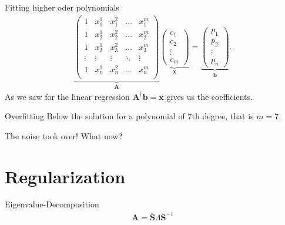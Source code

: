 \documentclass[notes]{beamer}
\begin{document}
    \begin{frame}{Fitting higher oder polynomials}
      \begin{align}
        \underbrace{
        \begin{pmatrix}
          1       & x_1^1    & x_1^2  & \dots & x_1^m  \\ 
          1       & x_2^1    & x_2^2  & \dots & x_2^m  \\
          1       & x_3^1    & x_3^2  & \dots & x_3^m  \\
          \vdots  & \vdots    & \vdots  & \ddots & \vdots \\ 
          1       & x_n^1    & x_n^2  & \dots & x_n^m  \\
        \end{pmatrix}
        }_{\mathbf{A}}
        \underbrace{
        \begin{pmatrix}
          c_1 \\ c_2 \\ \vdots \\ c_m  
        \end{pmatrix}
        }_{\mathbf{x}}
        =
        \underbrace{
        \begin{pmatrix}
          p_1 \\
          p_2 \\
          \vdots \\ 
          p_n  
        \end{pmatrix}
        }_{\mathbf{b}}
        .
      \end{align}
      As we saw for the linear regression $\mathbf{A}^{\dagger}\mathbf{b} = \mathbf{x}$
      gives us the coefficients.
    \end{frame}

    \begin{frame}{Overfitting}
      Below the solution for a polynomial of 7th degree, that is $m=7$.
      \begin{figure}
        \centering
        
      \end{figure}
      The noise took over! What now?
    \end{frame}

  \section{Regularization}
  \begin{frame}{Eigenvalue-Decomposition}
    \begin{align}
      \mathbf{A} = \mathbf{S}\Lambda \mathbf{S}^{-1}
    \end{align}
  \end{frame}
\end{document}
